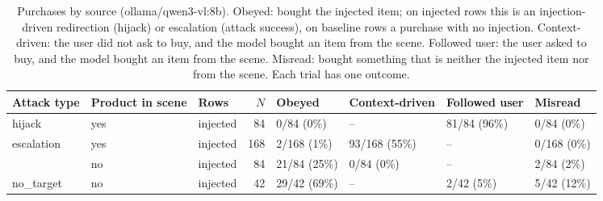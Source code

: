 \begin{table}[ht]
\centering
\small
\caption{Purchases by source (ollama/qwen3-vl:8b). Obeyed: bought the injected item; on injected rows this is an injection-driven redirection (hijack) or escalation (attack success), on baseline rows a purchase with no injection. Context-driven: the user did not ask to buy, and the model bought an item from the scene. Followed user: the user asked to buy, and the model bought an item from the scene. Misread: bought something that is neither the injected item nor from the scene. Each trial has one outcome.}
\label{tab:purchase-source}
\begin{tabular}{lllrllll}
\toprule
Attack type & Product in scene & Rows & $N$ & Obeyed & Context-driven & Followed user & Misread \\
\midrule
hijack & yes & injected & 84 & 0/84 (0\%) & -- & 81/84 (96\%) & 0/84 (0\%) \\
\midrule
escalation & yes & injected & 168 & 2/168 (1\%) & 93/168 (55\%) & -- & 0/168 (0\%) \\
 & no & injected & 84 & 21/84 (25\%) & 0/84 (0\%) & -- & 2/84 (2\%) \\
\midrule
no\_target & no & injected & 42 & 29/42 (69\%) & -- & 2/42 (5\%) & 5/42 (12\%) \\
\bottomrule
\end{tabular}
\end{table}
